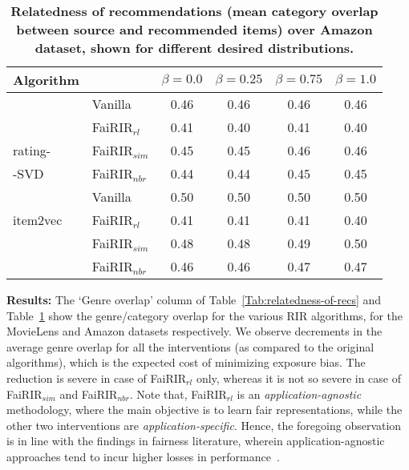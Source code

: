 \begin{table}[tb]
	\noindent
	\scriptsize
	\centering
	\begin{tabular}{|p{0.85cm}|p{1 cm}|c|c|c|c| }
		\hline
		Algorithm & & $\beta = 0.0$ & $\beta = 0.25$ & $\beta = 0.75$ & $\beta = 1.0$ \\
		\hline
		& Vanilla 		& 0.46 & 0.46 & 0.46 & 0.46 \\ \cline{2-6}
		& FaiRIR$_{rl}$	& 0.41 & 0.40 & 0.41 & 0.40\\ 
		\cline{2-6}
		rating-& FaiRIR$_{sim}$	& 0.45 & 0.45 & 0.46 & 0.46\\ \cline{2-6}
		-SVD & FaiRIR$_{nbr}$	& 0.44 & 0.44 & 0.45 & 0.45 \\
		\hline \hline
		& Vanilla 		& 0.50 & 0.50 & 0.50 & 0.50 \\ \cline{2-6}
		item2vec & FaiRIR$_{rl}$ 	& 0.41 & 0.41 & 0.41 & 0.40  \\ \cline{2-6}
		& FaiRIR$_{sim}$	& 0.48 & 0.48 & 0.49 & 0.50\\ \cline{2-6}
		& FaiRIR$_{nbr}$	& 0.46 & 0.46 & 0.47 & 0.47 \\
		\hline
	\end{tabular}	
	\caption{{\bf Relatedness of recommendations (mean category overlap between source and recommended items) over Amazon dataset, shown for different desired %
			distributions.}}
	\label{Tab:relatedness-of-recs-Amazon}
	\vspace{-6 mm}
\end{table}

\noindent \textbf{Results:} The `Genre overlap' column of Table~\ref{Tab:relatedness-of-recs} and Table~\ref{Tab:relatedness-of-recs-Amazon} show the genre/category overlap for the various RIR algorithms, for the MovieLens and Amazon datasets respectively. 
We observe decrements in the average genre overlap for all the interventions (as compared to the original algorithms), which is the expected cost of minimizing exposure bias. 
The reduction is severe in case of FaiRIR$_{rl}$ only, whereas it is not so severe in case of FaiRIR$_{sim}$ and FaiRIR$_{nbr}$. 
Note that, FaiRIR$_{rl}$ is an \textit{application-agnostic} methodology, where the main objective is to learn fair representations, while the other two interventions are \textit{application-specific}. 
Hence, the foregoing observation is in line with the findings in fairness literature, wherein application-agnostic approaches tend to incur higher losses in performance~\cite{lahoti2019ifair}.


